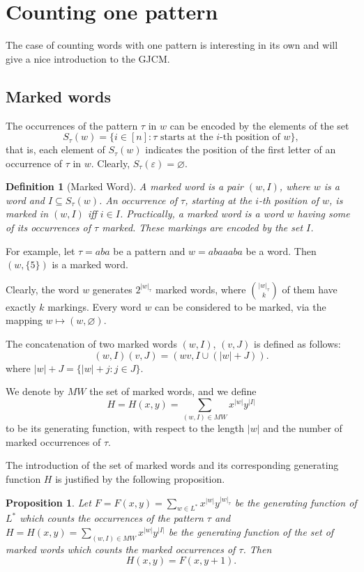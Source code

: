 \documentclass[12pt]{report}
\newtheorem{prop}{Proposition}
\newtheorem{defn}[mythm]{Definition}
\begin{document}
{{\section{Counting one pattern}

\noindent The case of counting words with one pattern is interesting in its own and will give a nice introduction to the GJCM.

\subsection{Marked words}

The occurrences of the pattern $\tau$ in $w$ can be encoded by the elements of the set
\[ S_\tau(w) = \{i \in [n]: \tau \textrm{ starts at the $i$-th position of $w$}\}, \]
that is, each element of $S_\tau(w)$ indicates the position of the first letter of an occurrence of $\tau$ in $w$. Clearly, $S_\tau(\varepsilon) = \varnothing$.

\begin{defn}[Marked Word]
A {\em marked word} is a pair $(w, I)$, where $w$ is a word and $I \subseteq S_\tau(w)$. An occurrence of $\tau$, starting at the $i$-th position of $w$, is {\em marked} in $(w, I)$ iff $i \in I$. Practically, a marked word is a word $w$ having some of its occurrences of $\tau$ marked. These markings are encoded by the set $I$.
\end{defn}

For example, let $\tau = aba$ be a pattern and $w=abaaaba$ be a word. Then $(w,\{5\})$ is a marked word.

Clearly, the word $w$ generates $2^{|w|_\tau}$ marked words, where $\binom{|w|_\tau}{k}$ of them have exactly $k$ markings. Every word $w$ can be considered to be marked, via the mapping $w \mapsto (w, \varnothing)$.

The concatenation of two marked words $(w, I)$, $(v, J)$ is defined as follows:
\[ (w, I)(v, J) = (wv, I \cup (|w| + J)). \]
where $|w| + J = \{|w| + j: j \in J\}$.

We denote by $MW$ the set of marked words, and we define
\[ H = H(x,y) = \sum\limits_{(w,I) \in MW} x^{|w|} y^{|I|} \]
to be its generating function, with respect to the length $|w|$ and the number of marked occurrences of $\tau$. 

The introduction of the set of marked words and its corresponding generating function $H$ is justified by the following proposition. 

\begin{prop}
Let $F = F(x,y) = \sum\limits_{w \in L^*} x^{|w|} y^{|w|_\tau}$ be the generating function of $L^*$ which counts the occurrences of the pattern $\tau$ and $H = H(x,y) = \sum\limits_{(w, I) \in MW} x^{|w|} y^{|I|}$ be the generating function of the set of marked words which counts the marked occurrences of $\tau$. Then
\[ H(x,y) = F(x, y+1). \]  
\end{prop}

}}
\end{document}
